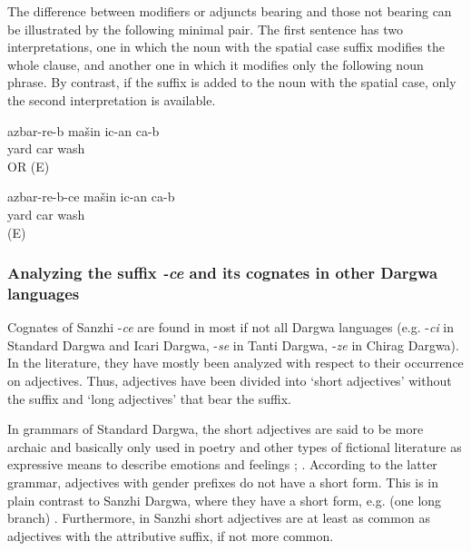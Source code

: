The difference between modifiers or adjuncts bearing  and those not bearing  can be illustrated by the following minimal pair. The first sentence has two interpretations, one in which the noun with the spatial case suffix modifies the whole clause, and another one in which it modifies only the following noun phrase. By contrast, if the suffix  is added to the noun with the spatial case, only the second interpretation is available.
%
\begin{exe}
	\ex	\label{ex:‎‎The car has to be washed in the yard minor}
	\gll	azbar-re-b	mašin	ic-an	ca-b\\
		yard	car	wash	\\
	\glt	{} OR  (E)

	\ex	\label{ex:‎‎‎The car that is in the yard has to be washed minor}
	\gll	azbar-re-b-ce	mašin	ic-an	ca-b\\
		yard	car	wash	\\
	\glt	{} (E)
\end{exe}


\subsubsection{Analyzing the suffix \textit{-ce} and its cognates in other Dargwa languages}
\label{sssec:Analyzing the suffix -ce and its cognates in other Dargwa languages}

Cognates of Sanzhi -\textit{ce} are found in most if not all Dargwa languages (e.g. -\textit{ci} in Standard Dargwa and Icari Dargwa, -\textit{se} in Tanti Dargwa, -\textit{ze} in Chirag Dargwa). In the literature, they have mostly been analyzed with respect to their occurrence on adjectives. Thus, adjectives have been divided into `short adjectives' without the suffix and `long adjectives' that bear the suffix.

In grammars of Standard Dargwa, the short adjectives are said to be more archaic and basically only used in poetry and other types of fictional literature as expressive means to describe emotions and feelings \citep[26]{vandenBerg2001}; \citep[207]{Abdullaev2014}. According to the latter grammar, adjectives with gender prefixes do not have a short form. This is in plain contrast to Sanzhi Dargwa, where they have a short form, e.g.  (one long branch) . Furthermore, in Sanzhi short adjectives are at least as common as adjectives with the attributive suffix, if not more common.

